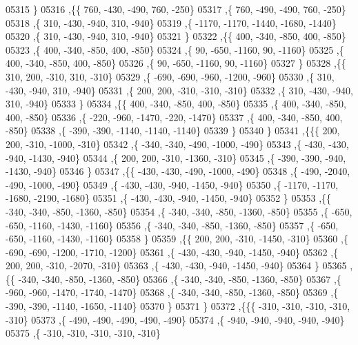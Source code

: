 \begin{DoxyCode}
05315     \}
05316    ,\{\{   760,  -430,  -490,   760,  -250\}
05317     ,\{   760,  -490,  -490,   760,  -250\}
05318     ,\{   310,  -430,  -940,   310,  -940\}
05319     ,\{ -1170, -1170, -1440, -1680, -1440\}
05320     ,\{   310,  -430,  -940,   310,  -940\}
05321     \}
05322    ,\{\{   400,  -340,  -850,   400,  -850\}
05323     ,\{   400,  -340,  -850,   400,  -850\}
05324     ,\{    90,  -650, -1160,    90, -1160\}
05325     ,\{   400,  -340,  -850,   400,  -850\}
05326     ,\{    90,  -650, -1160,    90, -1160\}
05327     \}
05328    ,\{\{   310,   200,  -310,   310,  -310\}
05329     ,\{  -690,  -690,  -960, -1200,  -960\}
05330     ,\{   310,  -430,  -940,   310,  -940\}
05331     ,\{   200,   200,  -310,  -310,  -310\}
05332     ,\{   310,  -430,  -940,   310,  -940\}
05333     \}
05334    ,\{\{   400,  -340,  -850,   400,  -850\}
05335     ,\{   400,  -340,  -850,   400,  -850\}
05336     ,\{  -220,  -960, -1470,  -220, -1470\}
05337     ,\{   400,  -340,  -850,   400,  -850\}
05338     ,\{  -390,  -390, -1140, -1140, -1140\}
05339     \}
05340    \}
05341   ,\{\{\{   200,   200,  -310, -1000,  -310\}
05342     ,\{  -340,  -340,  -490, -1000,  -490\}
05343     ,\{  -430,  -430,  -940, -1430,  -940\}
05344     ,\{   200,   200,  -310, -1360,  -310\}
05345     ,\{  -390,  -390,  -940, -1430,  -940\}
05346     \}
05347    ,\{\{  -430,  -430,  -490, -1000,  -490\}
05348     ,\{  -490, -2040,  -490, -1000,  -490\}
05349     ,\{  -430,  -430,  -940, -1450,  -940\}
05350     ,\{ -1170, -1170, -1680, -2190, -1680\}
05351     ,\{  -430,  -430,  -940, -1450,  -940\}
05352     \}
05353    ,\{\{  -340,  -340,  -850, -1360,  -850\}
05354     ,\{  -340,  -340,  -850, -1360,  -850\}
05355     ,\{  -650,  -650, -1160, -1430, -1160\}
05356     ,\{  -340,  -340,  -850, -1360,  -850\}
05357     ,\{  -650,  -650, -1160, -1430, -1160\}
05358     \}
05359    ,\{\{   200,   200,  -310, -1450,  -310\}
05360     ,\{  -690,  -690, -1200, -1710, -1200\}
05361     ,\{  -430,  -430,  -940, -1450,  -940\}
05362     ,\{   200,   200,  -310, -2070,  -310\}
05363     ,\{  -430,  -430,  -940, -1450,  -940\}
05364     \}
05365    ,\{\{  -340,  -340,  -850, -1360,  -850\}
05366     ,\{  -340,  -340,  -850, -1360,  -850\}
05367     ,\{  -960,  -960, -1470, -1740, -1470\}
05368     ,\{  -340,  -340,  -850, -1360,  -850\}
05369     ,\{  -390,  -390, -1140, -1650, -1140\}
05370     \}
05371    \}
05372   ,\{\{\{  -310,  -310,  -310,  -310,  -310\}
05373     ,\{  -490,  -490,  -490,  -490,  -490\}
05374     ,\{  -940,  -940,  -940,  -940,  -940\}
05375     ,\{  -310,  -310,  -310,  -310,  -310\}

\end{DoxyCode}
